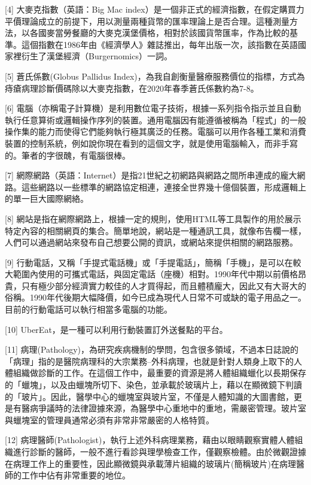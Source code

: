 \documentclass[a5paper, 11pt
]{book}
\begin{document}
{[}4{]} 大麥克指數（英語：Big Mac
index）是一個非正式的經濟指數，在假定購買力平價理論成立的前提下，用以測量兩種貨幣的匯率理論上是否合理。這種測量方法，以各國麥當勞餐廳的大麥克漢堡價格，相對於該國貨幣匯率，作為比較的基準。這個指數在1986年由《經濟學人》雜誌推出，每年出版一次，該指數在英語國家裡衍生了漢堡經濟（Burgernomics）一詞。

{[}5{]} 蒼氏係數(Globus Pallidus
Index)，為我自創衡量醫療服務價位的指標，方式為痔瘡病理診斷價碼除以大麥克指數，在2020年春季蒼氏係數約為7-8。

{[}6{]}
電腦（亦稱電子計算機）是利用數位電子技術，根據一系列指令指示並且自動執行任意算術或邏輯操作序列的裝置。通用電腦因有能遵循被稱為「程式」的一般操作集的能力而使得它們能夠執行極其廣泛的任務。電腦可以用作各種工業和消費裝置的控制系統，例如說你現在看到的這個文字，就是使用電腦輸入，而非手寫的。筆者的字很醜，有電腦很棒。

{[}7{]}
網際網路（英語：Internet）是指21世紀之初網路與網路之間所串連成的龐大網路。這些網路以一些標準的網路協定相連，連接全世界幾十億個裝置，形成邏輯上的單一巨大國際網絡。

{[}8{]}
網站是指在網際網路上，根據一定的規則，使用HTML等工具製作的用於展示特定內容的相關網頁的集合。簡單地說，網站是一種通訊工具，就像布告欄一樣，人們可以通過網站來發布自己想要公開的資訊，或網站來提供相關的網路服務。

{[}9{]}
行動電話，又稱「手提式電話機」或「手提電話」，簡稱「手機」，是可以在較大範圍內使用的可攜式電話，與固定電話（座機）相對。1990年代中期以前價格昂貴，只有極少部分經濟實力較佳的人才買得起，而且體積龐大，因此又有大哥大的俗稱。1990年代後期大幅降價，如今已成為現代人日常不可或缺的電子用品之一。目前的行動電話可以執行相當多電腦的功能。

{[}10{]} UberEat，是一種可以利用行動裝置訂外送餐點的平台。

{[}11{]}
病理(Pathology)，為研究疾病機制的學問，包含很多領域，不過本日誌說的「病理」指的是醫院病理科的大宗業務--外科病理，也就是針對人類身上取下的人體組織做診斷的工作。在這個工作中，最重要的資源是將人體組織蠟化以長期保存的「蠟塊」，以及由蠟塊所切下、染色，並承載於玻璃片上，藉以在顯微鏡下判讀的「玻片」。因此，醫學中心的蠟塊室與玻片室，不僅是人體知識的大圖書館，更是有醫病爭議時的法律證據來源，為醫學中心重地中的重地，需嚴密管理。玻片室與蠟塊室的管理員通常必須有非常非常嚴密的人格特質。

{[}12{]}
病理醫師(Pathologist)，執行上述外科病理業務，藉由以眼睛觀察實體人體組織進行診斷的醫師，一般不進行看診與理學檢查工作，僅觀察檢體。由於微觀證據在病理工作上的重要性，因此顯微鏡與承載薄片組織的玻璃片(簡稱玻片)在病理醫師的工作中佔有非常重要的地位。
\end{document}
